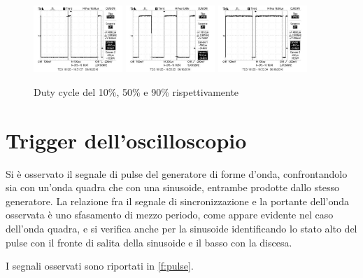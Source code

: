 \documentclass[10pt,a4paper]{article}
\begin{document}
\begin{figure}[h]
	\centering
	\includegraphics[width=0.3\textwidth]{../Oscilloscopio/10percento.jpg}
	\includegraphics[width=0.3\textwidth]{../Oscilloscopio/50percento.jpg}
	\includegraphics[width=0.3\textwidth]{../Oscilloscopio/90percento.jpg}
	\caption{Duty cycle del 10\%, 50\% e 90\% rispettivamente}
	\label{f:duty}
\end{figure}

\section{Trigger dell'oscilloscopio}
Si è osservato il segnale di pulse del generatore di forme d'onda, confrontandolo sia con un'onda quadra che con una sinusoide, entrambe prodotte dallo stesso generatore.
La relazione fra il segnale di sincronizzazione e la portante dell'onda osservata è uno sfasamento di mezzo periodo, come appare evidente nel caso dell'onda quadra, e si verifica anche per la sinusoide identificando lo stato alto del pulse con il fronte di salita della sinusoide e il basso con la discesa.

I segnali osservati sono riportati in \figurename{\ref{f:pulse}}.
\end{document}
